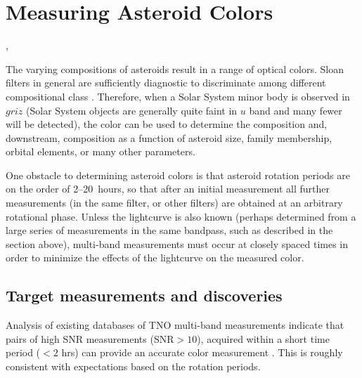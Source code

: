 %
%

\section{Measuring Asteroid Colors}
\def\secname{\chpname:colors}\label{sec:\secname}

,

The varying compositions of asteroids result in a range of optical
colors. Sloan filters in general are sufficiently diagnostic to
discriminate among different compositional class
\citep[e.g.,][]{2008Icar..198..138P}.
Therefore, when a Solar System minor body is observed in $griz$ (Solar
System objects are generally quite faint in $u$ band and many fewer will
be detected),
the color can be used to determine the
composition and, downstream, composition as a function of asteroid size,
family membership, orbital elements, or many other parameters.


One obstacle to determining asteroid colors is that asteroid rotation
periods are on the order of 2--20~hours, so that after an initial
measurement all further measurements (in the same filter, or other
filters) are obtained at an arbitrary rotational phase. Unless the
lightcurve is also known (perhaps determined from a large series of
measurements in the same bandpass, such as described in the section
above), multi-band measurements must occur at closely spaced times in
order to minimize the effects of the lightcurve on the measured color.


\subsection{Target measurements and discoveries}
\label{sec:\secname:targets}

Analysis of existing databases of TNO multi-band measurements indicate
that pairs of high SNR measurements (SNR$>10$), acquired within a
short time period ($<2$ hrs) can provide an accurate color measurement
\citep{2015A&A...577A..35P}. This is roughly consistent with
expectations based on the rotation periods.


